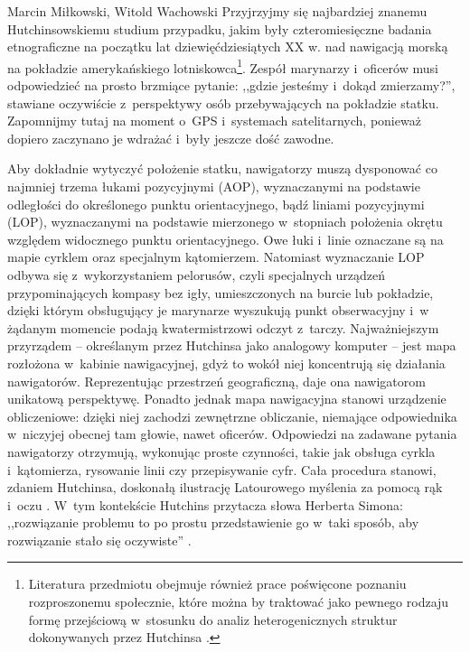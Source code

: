\begin{artplenv2auth}{Marcin Miłkowski, Witold Wachowski}
Przyjrzyjmy się najbardziej znanemu Hutchinsowskiemu studium przypadku, jakim były czteromiesięczne badania etnograficzne na początku lat dziewięćdziesiątych XX w. nad nawigacją morską na pokładzie amerykańskiego lotniskowca\footnote{Literatura przedmiotu obejmuje również prace poświęcone poznaniu rozproszonemu społecznie, które można by traktować jako pewnego rodzaju formę przejściową w~stosunku do analiz heterogenicznych struktur dokonywanych przez Hutchinsa
\parencites[][]{roberts_self-management_1964}[][]{salomon_distributed_1993}. %
 }. Zespół marynarzy i~oficerów musi odpowiedzieć na prosto brzmiące pytanie: ,,gdzie jesteśmy i~dokąd zmierzamy?'', stawiane oczywiście z~perspektywy osób przebywających na pokładzie statku. Zapomnijmy tutaj na moment o~GPS i~systemach satelitarnych, ponieważ dopiero zaczynano je wdrażać i~były jeszcze dość zawodne.

Aby dokładnie wytyczyć położenie statku, nawigatorzy muszą dysponować co najmniej trzema łukami pozycyjnymi (AOP), wyznaczanymi na podstawie odległości do określonego punktu orientacyjnego, bądź liniami pozycyjnymi (LOP), wyznaczanymi na podstawie mierzonego w~stopniach położenia okrętu względem widocznego punktu orientacyjnego. Owe łuki i~linie oznaczane są na mapie cyrklem oraz specjalnym kątomierzem. Natomiast wyznaczanie LOP odbywa się z~wykorzystaniem pelorusów, czyli specjalnych urządzeń przypominających kompasy bez igły, umieszczonych na burcie lub pokładzie, dzięki którym obsługujący je marynarze wyszukują punkt obserwacyjny i~w żądanym momencie podają kwatermistrzowi odczyt z~tarczy. Najważniejszym przyrządem -- określanym przez Hutchinsa jako analogowy komputer -- jest mapa rozłożona w~kabinie nawigacyjnej, gdyż to wokół niej koncentrują się działania nawigatorów. Reprezentując przestrzeń geograficzną, daje ona nawigatorom unikatową perspektywę. Ponadto jednak mapa nawigacyjna stanowi urządzenie obliczeniowe: dzięki niej zachodzi zewnętrzne obliczanie, niemające odpowiednika w~niczyjej obecnej tam głowie, nawet oficerów. Odpowiedzi na zadawane pytania nawigatorzy otrzymują, wykonując proste czynności, takie jak obsługa cyrkla i~kątomierza, rysowanie linii czy przepisywanie cyfr. Cała procedura stanowi, zdaniem Hutchinsa, doskonałą ilustrację Latourowego myślenia za pomocą rąk i~oczu
\parencite[][s.~142–143]{hutchins_cognition_1995}. %
 W~tym kontekście Hutchins przytacza słowa Herberta Simona: ,,rozwiązanie problemu to po prostu przedstawienie go w~taki sposób, aby rozwiązanie stało się oczywiste'' 
\parencite[][s.~117]{hutchins_cognition_1995}.%



\end{artplenv2auth}
